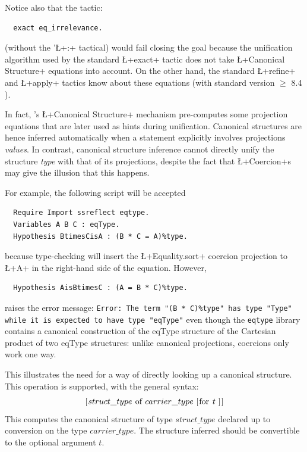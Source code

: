 Notice also that the tactic:
\begin{lstlisting}
  exact eq_irrelevance.
\end{lstlisting}
(without the '\L+:+ tactical) would fail closing the goal because
the unification algorithm used by the standard \L+exact+
tactic does not take \L+Canonical Structure+ equations into
account. On the other hand, the standard \L+refine+ and \L+apply+
tactics  know about these equations (with standard \Coq{} version
$\geq$ 8.4 ).

In fact, \Coq{}'s \L+Canonical Structure+ mechanism pre-computes some
projection equations that are later used as hints during
unification. Canonical structures are hence inferred automatically
when a statement explicitly involves projections \emph{values}.
In contrast, canonical structure inference cannot directly unify the
structure \emph{type} with that of its projections, despite the fact
that \L+Coercion+s may give the illusion that this happens.

For example, the following script will be accepted
\begin{lstlisting}
  Require Import ssreflect eqtype.
  Variables A B C : eqType.
  Hypothesis BtimesCisA : (B * C = A)%type.
\end{lstlisting}
because type-checking will insert the \L+Equality.sort+ coercion projection
to \L+A+ in the right-hand side of the equation. However,
\begin{lstlisting}
  Hypothesis AisBtimesC : (A = B * C)%type.
\end{lstlisting}
raises the error message: \texttt{Error: The term "(B *
  C)\%type" has type "Type" while it is expected to have type "eqType"}
even though the \texttt{eqtype} library contains a canonical construction
of the eqType structure of the Cartesian product of two eqType
structures: unlike canonical projections, coercions only work one way.

This illustrates the need for a way of directly looking up a canonical
structure. This operation is supported, with the general syntax:
$$\C{[}struct\_type\ \C{of}\ carrier\_type\ [\C{for}\ t\ ]\C{]}$$
This computes the canonical structure of type
$struct\_type$ declared up to conversion on the type $carrier\_type$.
The structure inferred should be convertible to the optional argument
$t$.

